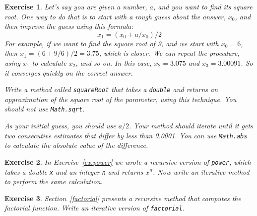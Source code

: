 \documentclass[12pt]{book}
\theoremstyle{exercise}
\newtheorem{exercise}{Exercise}[chapter]
\newcommand{\java}[1]{\verb"#1"}
\begin{document}
\begin{exercise}

Let's say you are given a number, $a$, and you want to find its square root.
One way to do that is to start with a rough guess about the answer, $x_0$, and then improve the guess using this formula:
%
\[ x_1 =(x_0 + a/x_0) / 2 \]
%
For example, if we want to find the square root of 9, and we start with $x_0 = 6$, then $x_1 = (6 + 9/6) / 2 = 3.75$, which is closer.
We can repeat the procedure, using $x_1$ to calculate $x_2$, and so on.
In this case, $x_2 = 3.075$ and $x_3 = 3.00091$.
So it converges quickly on the correct answer.

Write a method called \java{squareRoot} that takes a \java{double} and returns an approximation of the square root of the parameter, using this technique.
You should not use \java{Math.sqrt}.

As your initial guess, you should use $a/2$.
Your method should iterate until it gets two consecutive estimates that differ by less than 0.0001.
You can use \java{Math.abs} to calculate the absolute value of the difference.

\end{exercise}


\begin{exercise}

In Exercise~\ref{ex.power} we wrote a recursive version of \java{power}, which takes a double \java{x} and an integer \java{n} and returns $x^n$.
Now write an iterative method to perform the same calculation.

\end{exercise}


\begin{exercise}

Section~\ref{factorial} presents a recursive method that computes the factorial function.
Write an iterative version of \java{factorial}.

\end{exercise}
\end{document}
